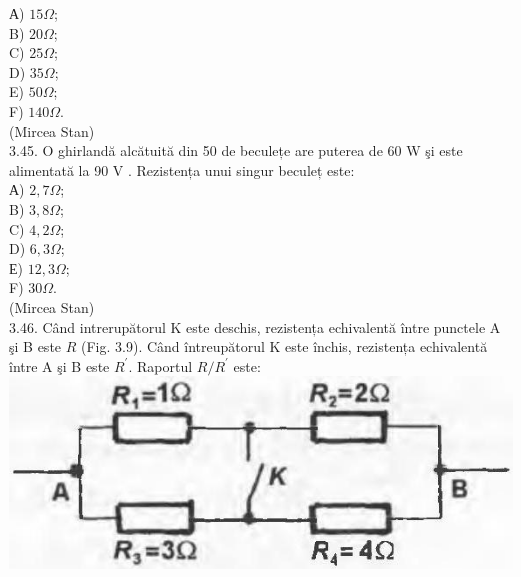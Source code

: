 \documentclass[10pt]{article}
\begin{document}
А) $15 \Omega$;\\
B) $20 \Omega$;\\
C) $25 \Omega$;\\
D) $35 \Omega$;\\
E) $50 \Omega$;\\
F) $140 \Omega$.\\
(Mircea Stan)\\
3.45. O ghirlandă alcătuită din 50 de beculețe are puterea de 60 W şi este alimentată la 90 V . Rezistența unui singur beculeț este:\\
А) $2,7 \Omega$;\\
B) $3,8 \Omega$;\\
C) $4,2 \Omega$;\\
D) $6,3 \Omega$;\\
Е) $12,3 \Omega$;\\
F) $30 \Omega$.\\
(Mircea Stan)\\
3.46. Când intrerupătorul K este deschis, rezistența echivalentă între punctele A şi B este $R$ (Fig. 3.9). Când întreupătorul K este închis, rezistența echivalentă între A şi B este $R^{\prime}$. Raportul $R / R^{\prime}$ este:\\
\includegraphics[max width=\textwidth, center]{2025_07_01_5b3ff9fa0d508c8e9f17g-153}
\end{document}
